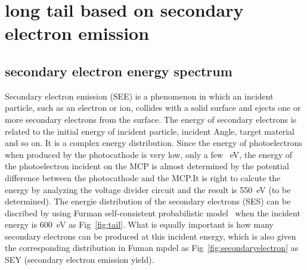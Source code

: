 \documentclass{article}
\begin{document}
\section{long tail based on secondary electron emission}\label{sec:see}


\subsection{secondary electron energy spectrum}\label{subsec:fuman}
Secondary electron emission (SEE) is a phenomenon in which an incident particle, such as an electron or ion,
collides with a solid surface and ejects one or more secondary electrons from the surface.
The energy of secondary electrons is related to the initial energy of incident particle, incident Angle, target material and so on.
It is a complex energy distribution.
Since the energy of photoelectrons when produced by the photocathode is very low, only a few \SI{}{eV},
the energy of the photoelectron incident on the MCP is almost determined by the potential difference
between the photocathode and the MCP.\@ It is right to calcute the energy by analyzing the voltage divider circuit and the result is \SI{550}{eV} (to be determined).
The energie distribution of the secondary electrons (SES) can be discribed by using Furman self-consistent probabilistic model~\cite{2002Probabilistic}
when the incident energy is \SI{600}{eV} as Fig~\ref{fig:tail}.
What is equally important is how many secondary electrons can be produced at this incident energy,
which is also given the corresponding distribution in Fuman mpdel\cite{2002Probabilistic} as Fig~\ref{fig:secondaryelectron}
as SEY (secondary electron emission yield).
\end{document}

